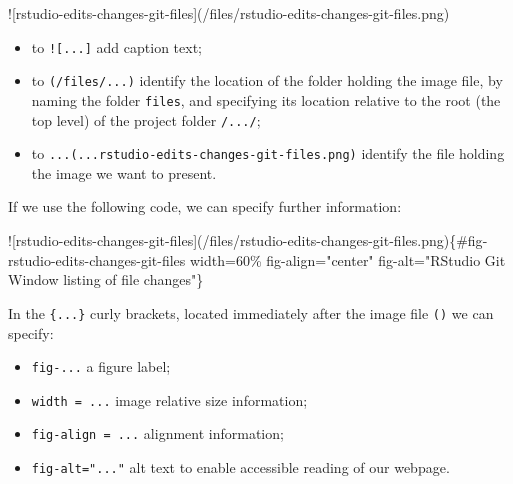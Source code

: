 \documentclass[
  letterpaper,
  DIV=11,
  numbers=noendperiod]{scrreprt}
\newenvironment{Shaded}{\begin{snugshade}}{\end{snugshade}}
\newcommand{\CommentTok}[1]{\textcolor[rgb]{0.37,0.37,0.37}{#1}}
\newcommand{\NormalTok}[1]{\textcolor[rgb]{0.00,0.23,0.31}{#1}}
\newcommand{\SpecialCharTok}[1]{\textcolor[rgb]{0.37,0.37,0.37}{#1}}
\providecommand{\tightlist}{%
  \setlength{\itemsep}{0pt}\setlength{\parskip}{0pt}}
\begin{document}
\begin{Shaded}
\begin{Highlighting}[]
\SpecialCharTok{!}\NormalTok{[rstudio}\SpecialCharTok{{-}}\NormalTok{edits}\SpecialCharTok{{-}}\NormalTok{changes}\SpecialCharTok{{-}}\NormalTok{git}\SpecialCharTok{{-}}\NormalTok{files](}\SpecialCharTok{/}\NormalTok{files}\SpecialCharTok{/}\NormalTok{rstudio}\SpecialCharTok{{-}}\NormalTok{edits}\SpecialCharTok{{-}}\NormalTok{changes}\SpecialCharTok{{-}}\NormalTok{git}\SpecialCharTok{{-}}\NormalTok{files.png)}
\end{Highlighting}
\end{Shaded}

\begin{itemize}
\tightlist
\item
  to \texttt{!{[}...{]}} add caption text;
\item
  to \texttt{(/files/...)} identify the location of the folder holding
  the image file, by naming the folder \texttt{files}, and specifying
  its location relative to the root (the top level) of the project
  folder \texttt{/.../};
\item
  to \texttt{...(...rstudio-edits-changes-git-files.png)} identify the
  file holding the image we want to present.
\end{itemize}

If we use the following code, we can specify further information:

\begin{Shaded}
\begin{Highlighting}[]
\SpecialCharTok{!}\NormalTok{[rstudio}\SpecialCharTok{{-}}\NormalTok{edits}\SpecialCharTok{{-}}\NormalTok{changes}\SpecialCharTok{{-}}\NormalTok{git}\SpecialCharTok{{-}}\NormalTok{files](}\SpecialCharTok{/}\NormalTok{files}\SpecialCharTok{/}\NormalTok{rstudio}\SpecialCharTok{{-}}\NormalTok{edits}\SpecialCharTok{{-}}\NormalTok{changes}\SpecialCharTok{{-}}\NormalTok{git}\SpecialCharTok{{-}}\NormalTok{files.png)\{}\CommentTok{\#fig{-}rstudio{-}edits{-}changes{-}git{-}files width=60\% fig{-}align="center" fig{-}alt="RStudio Git Window listing of file changes"\}}
\end{Highlighting}
\end{Shaded}

In the \texttt{\{...\}} curly brackets, located immediately after the
image file \texttt{()} we can specify:

\begin{itemize}
\tightlist
\item
  \texttt{fig-...} a figure label;
\item
  \texttt{width\ =\ ...} image relative size information;
\item
  \texttt{fig-align\ =\ ...} alignment information;
\item
  \texttt{fig-alt="..."} alt text to enable accessible reading of our
  webpage.
\end{itemize}
\end{document}
